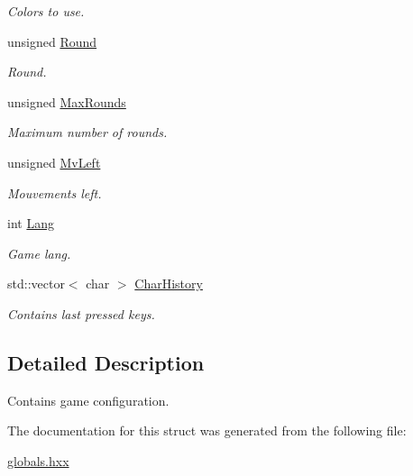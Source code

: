 \begin{DoxyCompactItemize}
\begin{DoxyCompactList}\small\item\em Colors to use. \end{DoxyCompactList}\item 
\hypertarget{struct_chase_game_1_1_s_game_status_afd8742d8a27af58077d4a9fe9f9b1c4f}{unsigned \hyperlink{struct_chase_game_1_1_s_game_status_afd8742d8a27af58077d4a9fe9f9b1c4f}{Round}}\label{struct_chase_game_1_1_s_game_status_afd8742d8a27af58077d4a9fe9f9b1c4f}

\begin{DoxyCompactList}\small\item\em Round. \end{DoxyCompactList}\item 
\hypertarget{struct_chase_game_1_1_s_game_status_a812deafc733953eaa199eba4ea8216f7}{unsigned \hyperlink{struct_chase_game_1_1_s_game_status_a812deafc733953eaa199eba4ea8216f7}{Max\-Rounds}}\label{struct_chase_game_1_1_s_game_status_a812deafc733953eaa199eba4ea8216f7}

\begin{DoxyCompactList}\small\item\em Maximum number of rounds. \end{DoxyCompactList}\item 
\hypertarget{struct_chase_game_1_1_s_game_status_ae06758bdc7c2bda68801afd314837532}{unsigned \hyperlink{struct_chase_game_1_1_s_game_status_ae06758bdc7c2bda68801afd314837532}{Mv\-Left}}\label{struct_chase_game_1_1_s_game_status_ae06758bdc7c2bda68801afd314837532}

\begin{DoxyCompactList}\small\item\em Mouvements left. \end{DoxyCompactList}\item 
\hypertarget{struct_chase_game_1_1_s_game_status_a93c5db2ceb07569075406e865949b4d9}{int \hyperlink{struct_chase_game_1_1_s_game_status_a93c5db2ceb07569075406e865949b4d9}{Lang}}\label{struct_chase_game_1_1_s_game_status_a93c5db2ceb07569075406e865949b4d9}

\begin{DoxyCompactList}\small\item\em Game lang. \end{DoxyCompactList}\item 
\hypertarget{struct_chase_game_1_1_s_game_status_a9aa8227d792a823032742d456e43b9a8}{std\-::vector$<$ char $>$ \hyperlink{struct_chase_game_1_1_s_game_status_a9aa8227d792a823032742d456e43b9a8}{Char\-History}}\label{struct_chase_game_1_1_s_game_status_a9aa8227d792a823032742d456e43b9a8}

\begin{DoxyCompactList}\small\item\em Contains last pressed keys. \end{DoxyCompactList}\end{DoxyCompactItemize}


\subsection{Detailed Description}
Contains game configuration. 

The documentation for this struct was generated from the following file\-:\begin{DoxyCompactItemize}
\item 
\hyperlink{globals_8hxx}{globals.\-hxx}\end{DoxyCompactItemize}
